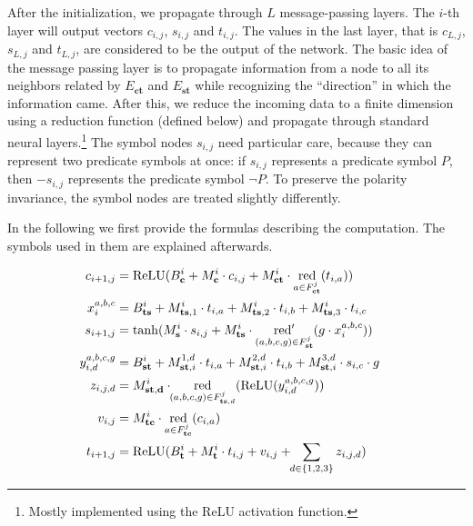 \documentclass{ecai}
\newcommand{\red}{\mathop{\mathrm{red}}\limits}
\newcommand{\redd}{\mathop{\mathrm{red'}}\limits}
\DeclareMathOperator{\ReLU}{ReLU}
\newcommand{\nbc}[3]{
                {\colorbox{#3}{\bfseries\sffamily\scriptsize\textcolor{white}{#1}}}
                {\textcolor{#3}{\sffamily\small$\blacktriangleright$\textit{#2}$\blacktriangleleft$}}
}
\newcommand{\todoat}[2]{\nbc{TODO: #1}{#2}{todocolor}}
\begin{document}
After the initialization, we %
propagate through
$L$ message-passing layers. The
$i$-th layer will output vectors $c_{i,j}$, $s_{i,j}$ and $t_{i,j}$.
The values in the last layer, that is $c_{L,j}$, $s_{L,j}$ and
$t_{L,j}$, are considered to be the output of the network.
The basic idea of the message passing layer is to propagate information from a node to all its neighbors related by $E_{\mathbf{ct}}$ and $E_{\mathbf{st}}$ while recognizing the ``direction'' in which the information came. 
After this, we 
reduce the incoming data to a finite dimension using a 
reduction function (defined below)
and %
propagate through standard
neural layers.\footnote{Mostly implemented using the ReLU activation function.} 
The symbol nodes $s_{i,j}$ need particular care, because they can represent two predicate symbols at once: if $s_{i,j}$ represents a predicate symbol $P$, then $-s_{i,j}$ represents the predicate symbol $\neg P$. To preserve the polarity invariance, the symbol nodes 
are
treated slightly differently.

In the following we first provide the formulas describing the computation. The
symbols used in them are explained afterwards.

\begin{align*}
c_{i+1,j} &= \ReLU(
  B^i_{\mathbf c} + M^i_{\mathbf c}\cdot c_{i,j} +
  M^i_{\mathbf{ct}}\cdot \red_{a\in F^j_{\mathbf{ct}}}(t_{i,a})
)\cr
x_{i}^{a,b,c} &=
  B^i_{\mathbf{ts}} +
  M^i_{\mathbf{ts},1}\cdot t_{i,a} +
  M^i_{\mathbf{ts},2}\cdot t_{i,b} +
  M^i_{\mathbf{ts},3}\cdot t_{i,c}
  \cr
s_{i+1,j} &= \tanh(
  M^i_{\mathbf s}\cdot s_{i,j} +
  M^i_{\mathbf{ts}}\cdot\redd_{(a,b,c,g)\in
  F^j_{\mathbf{st}}}(g\cdot x_{i}^{a,b,c})
)\cr
y_{i,d}^{a,b,c,g} &=
  B^i_{\mathbf{st}} +
  M^{1,d}_{\mathbf{st},i}\cdot t_{i,a} +
  M^{2,d}_{\mathbf{st},i}\cdot t_{i,b} +
  M^{3,d}_{\mathbf{st},i}\cdot s_{i,c}\cdot g
  \cr
z_{i,j,d} &= M^i_{\mathbf{st,d}}\cdot \kern -3pt
  \red_{(a,b,c,g)\in F^j_{\mathbf{ts},d}}(
  \ReLU(y_{i,d}^{a,b,c,g})
)\cr
v_{i,j} &= M^i_{\mathbf{tc}}\cdot \red_{a\in F^j_{\mathbf{tc}}}(c_{i,a})\cr
t_{i+1,j} &= \ReLU(
  B^i_{\mathbf t} +
  M^i_{\mathbf t}\cdot t_{i,j} + v_{i,j} + \kern -3pt
  \sum_{d\in\{1,2,3\}} z_{i,j,d}
)\cr
\end{align*}
\end{document}
